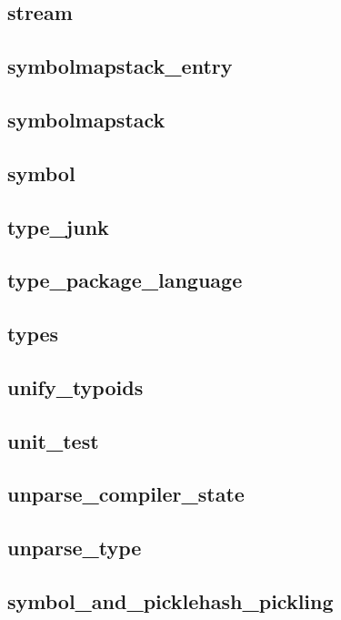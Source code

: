 \subsection{stream}						
\subsection{symbolmapstack\_entry}				
\subsection{symbolmapstack}					
\subsection{symbol}						
\subsection{type\_junk}						
\subsection{type\_package\_language}				
\subsection{types}						
\subsection{unify\_typoids}					
\subsection{unit\_test}						
\subsection{unparse\_compiler\_state}				
\subsection{unparse\_type}					
\subsection{symbol\_and\_picklehash\_pickling}			
